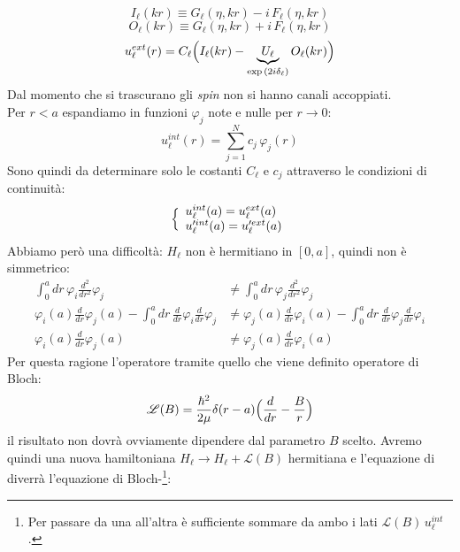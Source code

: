 $$ I_\ell (kr) \equiv G_\ell (\eta,kr) - i\, F_\ell(\eta,kr) $$
$$ O_\ell (kr) \equiv G_\ell (\eta,kr) + i\, F_\ell(\eta,kr) $$
\begin{equation}\label{0412_uext}
u_\ell^{ext} (r) = C_\ell \Bigl ( I_\ell(kr) - \underbrace{U_\ell}_{\exp{(2i\delta_\ell)}}O_\ell(kr) \Bigr )
\end{equation}
Dal momento che si trascurano gli \textit{spin} non si hanno canali accoppiati.\\ 
Per $r<a$ espandiamo in funzioni $\varphi_j$ note e nulle per $r\to0$: %
\begin{equation}\label{0412_uint}
u_\ell^{int} (r) = \sum_{j=1}^N c_j \,\varphi_j(r)
\end{equation}
Sono quindi da determinare solo le costanti $C_\ell$ e $c_j$ attraverso le condizioni di continuità:
\begin{equation}\label{0412_cont}
\Bigl \{
\begin{array}{l}
u_\ell^{int}(a) = u_\ell^{ext}(a)\\ 
u_\ell'^{int}(a) = u_\ell'^{ext}(a)	
\end{array}
\end{equation}
Abbiamo però una difficoltà: $H_\ell$ non è hermitiano in $[0,a]$, quindi non è simmetrico:
\begin{displaymath}
	\begin{aligned}
	\int_0^a dr\, \varphi_i \frac{d^2}{dr^2} \varphi_j &\not = \int_0^a dr\, \varphi_j \frac{d^2}{dr^2} \varphi_j \\ 
	\varphi_i (a) \frac{d}{dr}\varphi_j(a)-\int_0^a dr\,\frac{d}{dr}\varphi_i \frac{d}{dr}\varphi_j &\not = \varphi_j (a) \frac{d}{dr}\varphi_i (a) - \int_0^a dr\,\frac{d}{dr}\varphi_j \frac{d}{dr}\varphi_i  \\
	\varphi_i (a) \frac{d}{dr}\varphi_j(a) &\not = \varphi_j (a) \frac{d}{dr}\varphi_i (a) 
	\end{aligned}
\end{displaymath}
Per questa ragione  l'operatore tramite quello che viene definito operatore di Bloch:
\begin{equation}\label{0412_bloch}
\mathscr{L}(B) = \frac{\hbar^2}{2\mu}\delta(r-a) \Bigl ( \frac{d}{dr}-\frac{B}{r} \Bigr )
\end{equation}
il risultato non dovrà ovviamente dipendere dal parametro $B$ scelto. Avremo quindi una nuova hamiltoniana $H_\ell \to H_\ell + \mathscr{L}(B)$ hermitiana e l'equazione di \Sch{} diverrà l'equazione di Bloch-\Sch{}\footnote{Per passare da una all'altra è sufficiente sommare da ambo i lati $\mathscr{L}(B)\, u_\ell^{int}$.}:
